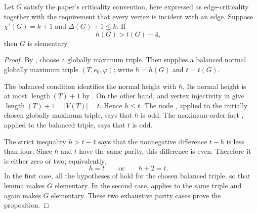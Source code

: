 \begin{theorem}
Let $G$ satisfy the paper's criticality convention, here expressed as
edge-criticality together with the requirement that every vertex is
incident with an edge.  Suppose $\chi'(G)=k+1$ and
$\Delta(G)+1\leq k$.  If
\[
 h(G)>t(G)-4,
\]
then $G$ is elementary.
\end{theorem}
\begin{proof}
By , choose a globally maximum triple.
Then  supplies a balanced normal globally
maximum triple $(T,e_0,\varphi)$; write $h=h(G)$ and $t=t(G)$.

The balanced condition identifies the normal height with $h$.  Its normal
height is at most $\operatorname{length}(T)+1$ by
.  On the other hand,
 and vertex injectivity in
 give
$\operatorname{length}(T)+1=|V(T)|=t$.  Hence $h\leq t$.
The node , applied to the initially chosen
globally maximum triple, says that $h$ is odd.  The maximum-order fact
, applied to the balanced triple, says
that $t$ is odd.

The strict inequality $h>t-4$ says that the nonnegative difference
$t-h$ is less than four.  Since $h$ and $t$ have the same parity, this
difference is even.  Therefore it is either zero or two; equivalently,
\[
 h=t \qquad\text{or}\qquad h+2=t.
\]
In the first case, all the hypotheses of
 hold for the chosen balanced triple,
so that lemma makes $G$ elementary.  In the second case,
 applies to the same triple and
again makes $G$ elementary.  These two exhaustive parity cases prove the
proposition.
\end{proof}
